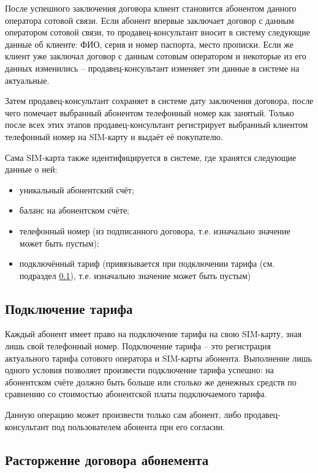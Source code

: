 После успешного заключения договора клиент становится абонентом данного оператора сотовой связи. Если абонент впервые заключает договор с данным оператором сотовой связи, то продавец-консультант вносит в систему следующие данные об клиенте: ФИО, серия и номер паспорта, место прописки. Если же клиент уже заключал договор с данным сотовым оператором и некоторые из его данных изменились -- продавец-консультант изменяет эти данные в системе на актуальные.

Затем продавец-консультант сохраняет в системе дату заключения договора, после чего помечает выбранный абонентом телефонный номер как занятый. Только после всех этих этапов продавец-консультант регистрирует выбранный клиентом телефонный номер на SIM-карту и выдаёт её покупателю.

Сама SIM-карта также идентифицируется в системе, где хранятся следующие данные о ней:
\begin{itemize}
    \item уникальный абонентский счёт;
    \item баланс на абонентском счёте;
    \item телефонный номер (из подписанного договора, т.е. изначально значение может быть пустым);
    \item подключённый тариф (привязывается при подключении тарифа (см. подраздел \ref{subsec:tariff-connection}), т.е. изначально значение может быть пустым)
\end{itemize}


\subsection{Подключение тарифа}\label{subsec:tariff-connection}


Каждый абонент имеет право на подключение тарифа на свою SIM-карту, зная лишь свой телефонный номер. Подключение тарифа -- это регистрация актуального тарифа сотового оператора и SIM-карты абонента. Выполнение лишь одного условия позволяет произвести подключение тарифа успешно: на абонентском счёте должно быть больше или столько же денежных средств по сравнению со стоимостью абонентской платы подключаемого тарифа.

Данную операцию может произвести только сам абонент, либо продавец-консультант под пользователем абонента при его согласии.


\subsection{Расторжение договора абонемента}


